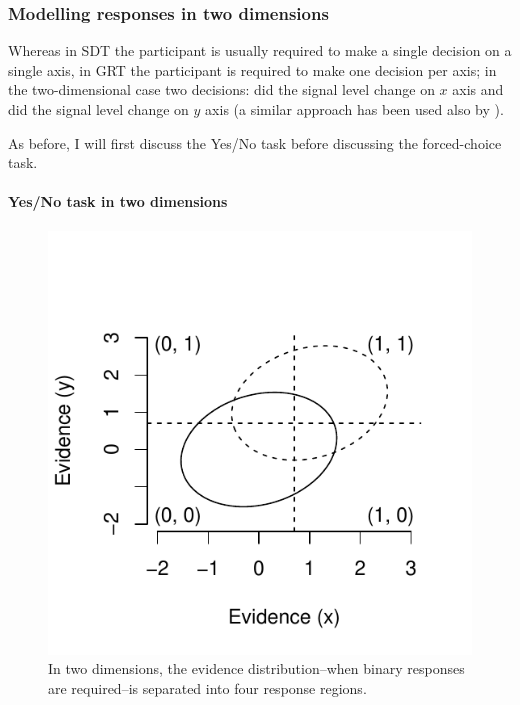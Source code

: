 \documentclass{article}\usepackage{knitr}
\begin{document}
\subsubsection{Modelling responses in two dimensions}
\label{sec:modelling_responses}

Whereas in SDT the participant is usually required to make a single decision on a single axis, in GRT the participant is required to make one decision per axis; in the two-dimensional case two decisions: did the signal level change on $x$ axis and did the signal level change on $y$ axis (a similar approach has been used also by \cite{wickens1992}). 

As before, I will first discuss the Yes/No task before discussing the forced-choice task.

\paragraph{Yes/No task in two dimensions}

\begin{figure}
\begin{center}
\begin{knitrout}
\color{fgcolor}
\includegraphics[width=\maxwidth]{figure/unnamed-chunk-9-1} 
\end{knitrout}
\end{center}
\caption{In two dimensions, the evidence distribution--when binary responses are required--is separated into four response regions.}
\label{fig:GRTsimple}
\end{figure}
\end{document}
